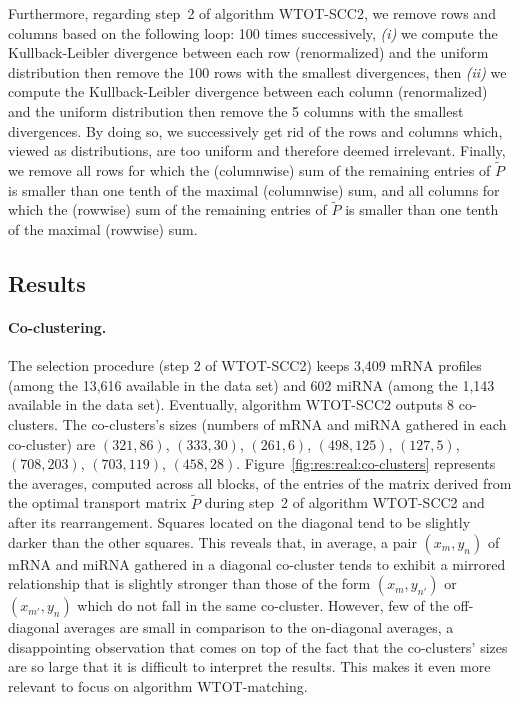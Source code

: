 Furthermore,  regarding step~2  of  algorithm WTOT-SCC2,  we  remove rows  and
columns based on  the following loop: 100 times  successively, \textit{(i)} we
compute the  Kullback-Leibler divergence  between each row  (renormalized) and
the  uniform  distribution  then  remove   the  100  rows  with  the  smallest
divergences,  then \textit{(ii)}  we compute  the Kullback-Leibler  divergence
between each  column (renormalized) and  the uniform distribution  then remove
the 5 columns with the smallest divergences.  By doing so, we successively get
rid of  the rows and columns  which, viewed as distributions,  are too uniform
and therefore  deemed irrelevant. Finally,  we remove  all rows for  which the
(columnwise) sum of  the remaining entries of $\tilde{P}$ is  smaller than one
tenth of the maximal (columnwise) sum, and all columns for which the (rowwise)
sum of the remaining  entries of $\tilde{P}$ is smaller than  one tenth of the
maximal (rowwise) sum.

\subsection{Results}
\label{sec:results}

\paragraph{Co-clustering.}

The selection procedure (step 2 of WTOT-SCC2) keeps 3,409 mRNA profiles (among
the 13,616 available in the data set) and 602 miRNA (among the 1,143 available
in the data  set). Eventually, algorithm WTOT-SCC2 outputs  8 co-clusters. The
co-clusters's sizes  (numbers of mRNA  and miRNA gathered in  each co-cluster)
are  $(321,86)$, $(333,30)$,  $(261,6)$, $(498,125)$,  $(127,5)$, $(708,203)$,
$(703,119)$, $(458,28)$.  Figure~\ref{fig:res:real:co-clusters} represents the
averages, computed  across all blocks,  of the  entries of the  matrix derived
from  the optimal  transport  matrix $\tilde{P}$  during  step~2 of  algorithm
WTOT-SCC2 and after  its rearrangement.  Squares located on  the diagonal tend
to be slightly darker than the other squares. This reveals that, in average, a
pair $(x_{m},y_{n})$ of mRNA and miRNA gathered in a diagonal co-cluster tends
to exhibit a mirrored relationship that is slightly stronger than those of the
form $(x_{m},  y_{n'})$ or  $(x_{m'}, y_{n})$  which do not  fall in  the same
co-cluster.  However, few of the off-diagonal averages are small in comparison
to the on-diagonal averages, a disappointing  observation that comes on top of
the fact  that the  co-clusters' sizes are  so large that  it is  difficult to
interpret the results. This makes it  even more relevant to focus on algorithm
WTOT-matching.



